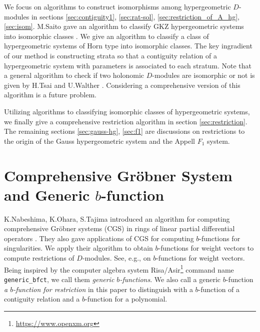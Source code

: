 \documentclass{article}
\begin{document}
We focus on algorithms to construct isomorphisms
among hypergeometric $D$-modules in sections \ref{sec:contiguity1},
\ref{sec:rat-sol}, \ref{sec:restriction_of_A_hg}, \ref{sec:isom}.
M.Saito gave an algorithm to classify GKZ hypergeometric systems
into isomorphic classes \cite{saito-isom}.
We give an algorithm to classify a class of hypergeometric systems of Horn type
\cite{berkesch} into isomorphic classes.
The key ingradient of our method is constructing strata so that
a contiguity relation of a hypergeometric system with parameters
is associated to each stratum.
Note that a general algorithm to check if two holonomic $D$-modules
are isomorphic or not is given by H.Tsai and U.Walther \cite{tw-hom}.
Considering a comprehensive version of this algorithm is a future problem.

Utilizing algorithms to classifying isomorphic classes
of hypergeometric systems, we finally give a comprehensive restriction
algorithm in section \ref{sec:restriction}.
The remaining sections \ref{sec:gauss-hg}, \ref{sec:f1} are discussions 
on restrictions to the origin
of the Gauss hypergeometric system and the Appell $F_1$ system.


%
\section{Comprehensive Gr\"obner System and Generic $b$-function} \label{sec:comprehensive}

K.Nabeshima, K.Ohara, S.Tajima introduced
an algorithm for computing comprehensive Gr\"obner systems (CGS) in rings of linear partial differential operators \cite{not-2016}.
They also gave applications of CGS for computing $b$-functions for singularities.
We apply their algorithm to obtain $b$-functions 
for weight vectors
to compute restrictions of $D$-modules. See, e.g., \cite[Chap 5]{SST} on $b$-functions for weight vectors. Being inspired by the computer algebra system 
Risa/Asir\footnote{\url{https://www.openxm.org}} command name
{\tt generic\_bfct}, we call them {\it generic $b$-functions}.
We also call a generic $b$-function {\it a $b$-function for restriction}
in this paper to distinguish with a $b$-function of a contiguity relation
and a $b$-function for a polynomial.
\end{document}
